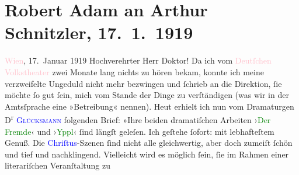 

               \section[Robert Adam an Arthur Schnitzler, 17. 1. 1919]{ Robert Adam an Arthur Schnitzler, 17. 1. 1919}\nopagebreak{}\rehead{ }\normalsize\beginnumbering{} \toendnotes[C]{\smallbreak\pagebreak[2]} 
\toendnotes[C]{\smallbreak}\pstart
           \raggedleft{}{\pb}\textcolor{pink}{Wien}{}\ledrightnote{\textcolor{pink}{Wien}}, 17. Januar 1919\pend
           \pstart{}Hochverehrter Herr Doktor!\pend\pstart
           Da ich vom \textcolor{pink}{Deutſchen Volkstheater}{}\ledrightnote{\textcolor{pink}{Volkstheater}} zwei Monate
                    lang nichts zu hören bekam, konnte ich meine verzweifelte Ungeduld nicht mehr
                    bezwingen und ſchrieb an die Direktion, ſie möchte ſo gut ſein, mich vom Stande
                    der Dinge zu verſtändigen (was wir in der Amtsſprache eine »Betreibung« nennen).
                    Heut erhielt ich nun vom Dramaturgen D\textsuperscript{r}{ }\textcolor{blue}{\textsc{Glücksmann}}{}\ledrightnote{\textcolor{blue}{Heinrich Glücksmann}} folgenden Brief:\pend
           \pstart
           »Ihre beiden dramatiſchen Arbeiten ›\textcolor{green}{Der Fremde}{}\ledrightnote{\textcolor{green}{Der Fremde}}‹
                    und ›\textcolor{green}{Yppl}{}\ledrightnote{\textcolor{green}{Der Fremde}}‹ ſind längſt geleſen. Ich geſtehe
                    ſofort: mit lebhafteſtem Genuß. Die \textcolor{blue}{Chriſtus}{}\ledrightnote{\textcolor{blue}{Jesus}}-Szenen ſind nicht alle gleichwertig, aber doch zumeiſt ſchön und
                    tief und nachklingend. Vielleicht wird es möglich ſein, ſie im Rahmen einer {\pb}literariſchen Veranſtaltung zu
